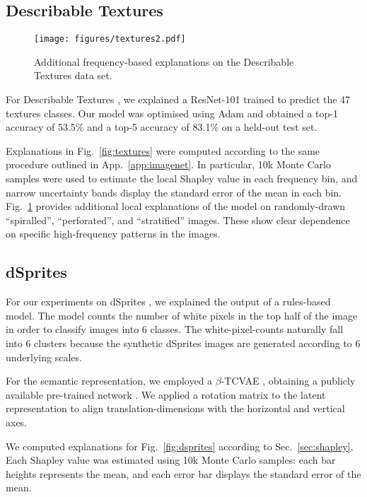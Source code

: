 \documentclass{article}
\DeclareRobustCommand{\Sec}[1]{Sec.~\ref{sec:#1}}
\DeclareRobustCommand{\App}[1]{App.~\ref{app:#1}}
\DeclareRobustCommand{\Fig}[1]{Fig.~\ref{fig:#1}}
\begin{document}
\subsection{Describable Textures}
\label{app:textures}


\begin{figure}[!t]
    \centering
    \texttt{[image: figures/textures2.pdf]}
    \caption{Additional frequency-based explanations on the  Describable Textures data set.}
    \label{fig:textures2}
\end{figure}


For Describable Textures \citep{describablestextures}, we explained a ResNet-101 \citep{resnet} trained to predict the 47 textures classes. Our model was optimised using Adam and obtained a top-1 accuracy of 53.5\% and a top-5 accuracy of 83.1\% on a held-out test set.

Explanations in \Fig{textures} were computed according to the same procedure outlined in \App{imagenet}. In particular, 10k Monte Carlo samples were used to estimate the local Shapley value in each frequency bin, and narrow uncertainty bands display the standard error of the mean in each bin. \Fig{textures2} provides additional local explanations of the model on randomly-drawn ``spiralled'', ``perforated'', and ``stratified'' images. These show clear dependence on specific high-frequency patterns in the images. 


\subsection{dSprites}
\label{app:dsprites}


For our experiments on dSprites \citep{dsprites17}, we explained the output of a rules-based model. The model counts the number of white pixels in the top half of the image in order to classify images into 6 classes. The white-pixel-counts naturally fall into 6 clusters because the synthetic dSprites images are generated according to 6 underlying scales.

For the semantic representation, we employed a $\beta$-TCVAE \citep{BetaVAEB}, obtaining a publicly available pre-trained network \citep{yanndubs2019}. We applied a rotation matrix to the latent representation to align translation-dimensions with the horizontal and vertical axes.

We computed explanations for \Fig{dsprites} according to \Sec{shapley}. Each Shapley value was estimated using 10k Monte Carlo samples: each bar heights represents the mean, and each error bar displays the standard error of the mean.
\end{document}
